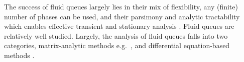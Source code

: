 The success of fluid queues largely lies in their mix of flexibility, any (finite) number of phases can be used, and their parsimony and analytic tractability which enables effective transient and stationary analysis \cite{ajr2005,ar2003,ar2004,bean2005b,bean2005,bot08,bean2009,dasilva2005,latouche2018,bnp2018}. Fluid queues are relatively well studied. Largely, the analysis of fluid queues falls into two categories, matrix-analytic methods e.g.~\cite{ajr2005,ar2003,ar2004,bean2005b,bean2005,bot08,bean2009,dasilva2005,latouche2018}, and differential equation-based methods \cite{anick1982,kk1995,blnos2022}. %


